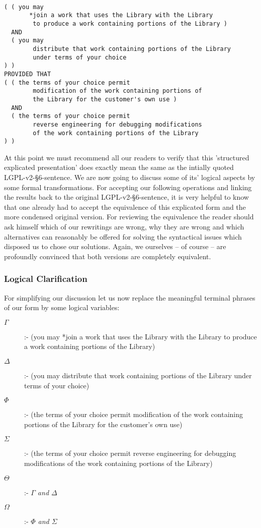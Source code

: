 \begin{verbatim}

( ( you may 
       *join a work that uses the Library with the Library
        to produce a work containing portions of the Library )
  AND 
  ( you may 
        distribute that work containing portions of the Library
        under terms of your choice 
) )
PROVIDED THAT
( ( the terms of your choice permit 
        modification of the work containing portions of 
        the Library for the customer's own use )
  AND
  ( the terms of your choice permit
        reverse engineering for debugging modifications 
        of the work containing portions of the Library   
) )
\end{verbatim}

At this point we must recommend all our readers to verify that this 'structured
explicated presentation' does exactly mean the same as the intially quoted
LGPL-v2-§6-sentence. We are now going to discuss some of its' logical aspects by
some formal transformations. For accepting our following operations and linking
the results back to the original LGPL-v2-§6-sentence, it is very helpful to know
that one already had to accept the equivalence of this explicated form and the
more condensed original version. For reviewing the equivalence the reader should
ask himself which of our rewritings are wrong, why they are wrong and which
alternatives can reasonably be offered for solving the syntactical issues which
disposed us to chose our solutions. Again, we ourselves -- of course -- are
profoundly convinced that both versions are completely equivalent.

\subsubsection{Logical Clarification}

For simplifying our discussion let us now replace the meaningful terminal
phrases of our form by some logical variables:

\begin{description}
  \item[$\Gamma$] :- (you may *join a work that uses the Library with the
  Library to produce a work containing portions of the Library) 
  \item[$\Delta$] :- (you may distribute that work containing portions of the
  Library under terms of your choice)
  \item[$\Phi$] :- (the terms of your choice permit modification of the work 
  containing portions of the Library for the customer's own use)
  \item[$\Sigma$] :- (the terms of your choice permit reverse engineering for
  debugging modifications of the work containing portions of the Library)
  \item[$\Theta$] :- \emph{$\Gamma$ and $\Delta$}
  \item[$\Omega$] :- \emph{$\Phi$ and $\Sigma$}
\end{description}

